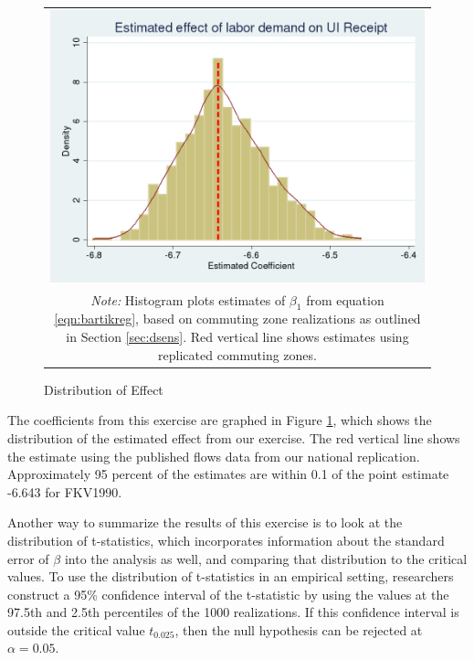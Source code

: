 \begin{figure}\centering
\caption{Distribution of Effect \label{fig:1990dist}}
\begin{tabular}{c}
\includegraphics[scale=.35]{./figures/beta_bartik_distribution_moe_new.png}\\
\multicolumn{1}{p{4.5in}}{\footnotesize \emph{Note:} Histogram plots estimates of $\beta_1$ from equation \ref{eqn:bartikreg}, based on commuting zone realizations as outlined in Section \ref{sec:dsens}. Red vertical line shows estimates using replicated commuting zones.}
\end{tabular}
\end{figure}

 The coefficients from this exercise are graphed in Figure \ref{fig:1990dist}, which shows the distribution of the estimated effect from our exercise. The red vertical line shows the estimate using the published flows data from our national replication. Approximately 95 percent of the estimates are within 0.1 of the point estimate -6.643 for FKV1990.

Another way to summarize the results of this exercise is to look at the distribution of t-statistics, which incorporates information about the standard error of $\beta$ into the analysis as well, and comparing that distribution to the critical values. To use the distribution of t-statistics in an empirical setting, researchers construct a 95\% confidence interval of the t-statistic by using the values at the 97.5th and 2.5th percentiles of the 1000 realizations. If this confidence interval is outside the critical value $t_{0.025}$, then the null hypothesis can be rejected at $\alpha = 0.05$. 

